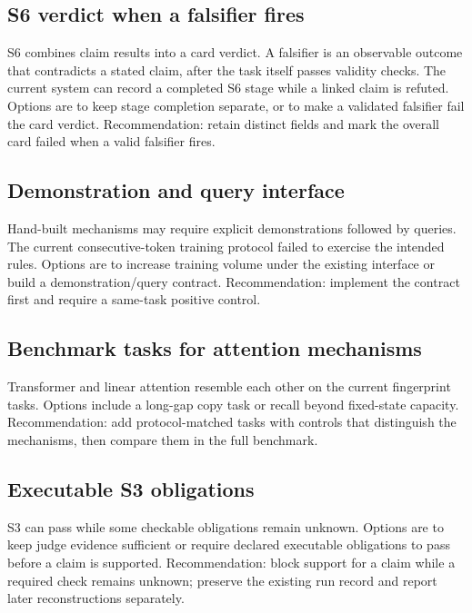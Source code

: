 \subsection{S6 verdict when a falsifier fires}

S6 combines claim results into a card verdict. A falsifier is an observable outcome that contradicts a stated claim, after the task itself passes validity checks. The current system can record a completed S6 stage while a linked claim is refuted. Options are to keep stage completion separate, or to make a validated falsifier fail the card verdict. Recommendation: retain distinct fields and mark the overall card failed when a valid falsifier fires.

\subsection{Demonstration and query interface}

Hand-built mechanisms may require explicit demonstrations followed by queries. The current consecutive-token training protocol failed to exercise the intended rules. Options are to increase training volume under the existing interface or build a demonstration/query contract. Recommendation: implement the contract first and require a same-task positive control.

\subsection{Benchmark tasks for attention mechanisms}

Transformer and linear attention resemble each other on the current fingerprint tasks. Options include a long-gap copy task or recall beyond fixed-state capacity. Recommendation: add protocol-matched tasks with controls that distinguish the mechanisms, then compare them in the full benchmark.

\subsection{Executable S3 obligations}

S3 can pass while some checkable obligations remain unknown. Options are to keep judge evidence sufficient or require declared executable obligations to pass before a claim is supported. Recommendation: block support for a claim while a required check remains unknown; preserve the existing run record and report later reconstructions separately.


